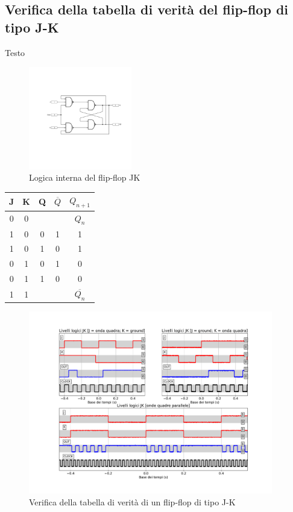 \documentclass[journal]{IEEEtran}
\begin{document}
\subsection{Verifica della tabella di verità del flip-flop di tipo J-K}
Testo

\begin{figure}[H]%
\centering
\begin{center}
\includegraphics[width=0.40\textwidth]{sch-simulations/digital/output/flip-flop-JK.pdf}
\end{center}
\caption{Logica interna del flip-flop JK}
\label{fig:circuit_JK}
\end{figure}

\begin{center}
\begin{tabular}{ |c|c|c|c|c| } 
 \hline
 J & K & Q & $\overline{Q}$ & $ Q_{n + 1} $ \\ \hline 
 0 & 0 &  &  & $Q_n$ \\ \hline
 1 & 0 & 0 & 1 & 1 \\ \hline
 1 & 0 & 1 & 0 & 1\\ \hline
 0 & 1 & 0 & 1 & 0 \\ \hline
 0 & 1 & 1 & 0 & 0 \\ \hline
 1 & 1 &  & & $\overline{Q_n}$ \\ \hline
\end{tabular}
\end{center}

\begin{figure}[t]%
\centering
\includegraphics[width=0.95\textwidth]{analysis/output/JK-truth.pdf}
\caption{Verifica della tabella di verità di un flip-flop di tipo J-K}
\label{fig:waveforms_no_sh_scope}
\end{figure}
\end{document}
